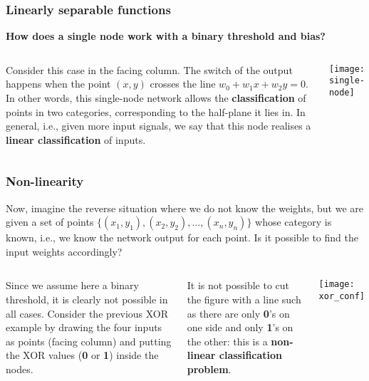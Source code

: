 %
\begin{frame}
\frametitle{Linearly separable functions}
\label{linearity}

\textbf{How does a single node work with a binary threshold and bias?}

\bigskip

\begin{columns}[c]

   Consider this case in the facing column. The
  switch of the output happens when the point \((x,y)\) crosses the
  line \(w_0 + w_1 x + w_2 y = 0\). In other words, this single-node
  network allows the \textbf{classification} of points in two
  categories, corresponding to the half-plane it lies in. In general,
  i.e., given more input signals, we say that this node realises a
  \textbf{linear classification} of inputs.

  \begin{center}
    \texttt{[image: single-node]}
  \end{center}

\end{columns}

\end{frame}

%
\begin{frame}
\frametitle{Non-linearity}

Now, imagine the reverse situation where we do not know the weights,
but we are given a set of points \(\lbrace{(x_1,y_1)}, (x_2,y_2),
\dots, (x_n,y_n)\rbrace\) whose category is known, i.e., we know the
network output for each point. Is it possible to find the input
weights accordingly?

\bigskip

\begin{columns}[c]
   Since we assume here a binary threshold, it
  is clearly not possible in all cases. Consider the previous XOR
  example by drawing the four inputs as points (facing column) and
  putting the XOR values (\textbf{0} or \textbf{1}) inside the
  nodes.

   It is not possible to cut the figure with a
  line such as there are only \textbf{0}'s on one side and only
  \textbf{1}'s on the other: this is a \textbf{non-linear
    classification problem}.
  \begin{center}
    \texttt{[image: xor\_conf]}
  \end{center}

\end{columns}

\end{frame}

